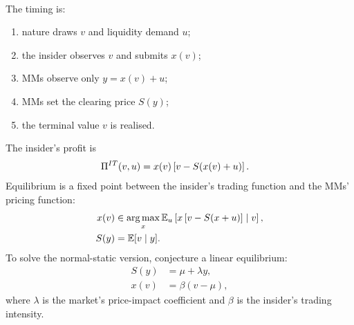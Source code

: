 \documentclass[a4paper,oneside,openany]{book}
\begin{document}
\begin{model}
\par\smallskip\noindent{}\\
The timing is:
\begin{enumerate}[label=\roman*.]
\setlength{\itemsep}{0pt}
\item nature draws $v$ and liquidity demand $u$;
\item the insider observes $v$ and submits $x(v)$;
\item MMs observe only $y=x(v)+u$;
\item MMs set the clearing price $S(y)$;
\item the terminal value $v$ is realised.
\end{enumerate}
The insider's profit is
\begin{align*}
\Pi^{IT}(v,u)&=x(v)\left[v-S(x(v)+u)\right].
\end{align*}
Equilibrium is a fixed point between the insider's trading function and the MMs' pricing function:
\begin{align*}
x(v)&\in\operatorname*{arg\,max}_{x}\mathbb{E}_u\left[x\left[v-S(x+u)\right]\mid v\right],\\
S(y)&=\mathbb{E}[v\mid y].
\end{align*}
To solve the normal-static version, conjecture a linear equilibrium:
\begin{align*}
S(y)&=\mu+\lambda y,\\
x(v)&=\beta(v-\mu),
\end{align*}
where $\lambda$ is the market's price-impact coefficient and $\beta$ is the insider's trading intensity.


\end{model}
\end{document}
